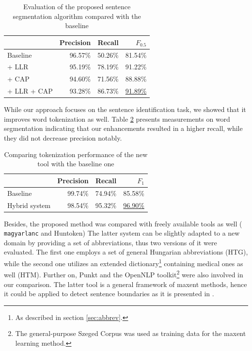 \begin{table}[H]
\centering
\caption{Evaluation of the proposed sentence segmentation algorithm compared with the baseline}
\label{tab:prec_rec}
\begin{tabular}{ l r r  r  } 
\hline
& Precision & Recall & $F_{0.5}$ \\
\hline
Baseline & 96.57\% & 50.26\% & 81.54\%  \\
+ LLR & 95.19\% & 78.19\% & 91.22\% \\
+ CAP & 94.60\% & 71.56\% & 88.88\% \\
+ LLR + CAP & 93.28\% & 86.73\% & \underline{91.89\%} \\
\hline
\end{tabular}
\end{table}


While our approach focuses on the sentence identification task, we showed that it improves word tokenization as well. 
Table \ref{tab:tok_eval} presents measurements on word segmentation indicating that our enhancements resulted in a higher recall, while they did not decrease precision notably. \label{sec:eval}


\begin{table}[H]
\centering
\caption{Comparing tokenization performance of the new tool with the baseline one}
\label{tab:tok_eval}
\begin{tabular}{ l r r r} 
\hline
& Precision & Recall & $F_{1}$ \\
\hline
Baseline & 99.74\% & 74.94\% & 85.58\%  \\
Hybrid system & 98.54\% & 95.32\% & \underline{96.90\%} \\
\hline
\end{tabular}
\end{table}

Besides, the proposed method was compared with freely available tools as well (
\texttt{magyarlanc} and Huntoken)
The latter system can be slightly adapted to a new domain by providing a set of abbreviations, thus two versions of it were evaluated. 
The first one employs a set of general Hungarian abbreviations (HTG), while the second one utilizes an extended dictionary\footnote{As described in section \ref{sec:abbrev}.} containing medical ones as well (HTM). 
Further on, Punkt \cite{kiss2006unsupervised} and the OpenNLP \cite{Baldridge2002} toolkit\footnote{The general-purpose Szeged Corpus was used as training data for the \acrlong{maxent} learning method.} were also involved in our comparison. 
The latter tool is a general framework of \acrlong{maxent} methods, hence it could be applied to detect sentence boundaries as it is presented in \cite{reynar1997maximum}.


